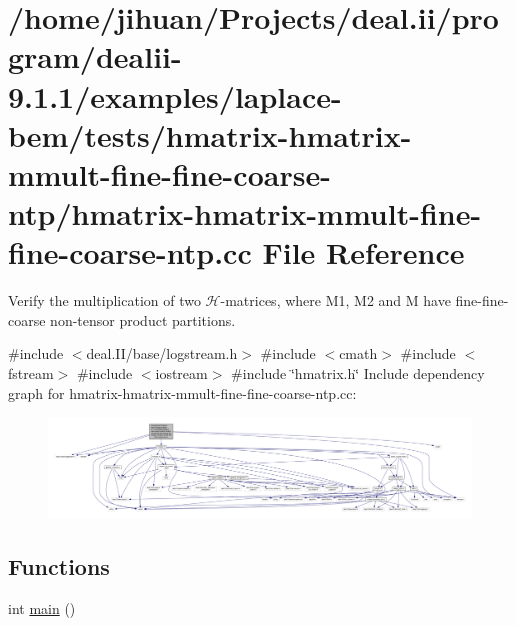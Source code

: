 \hypertarget{hmatrix-hmatrix-mmult-fine-fine-coarse-ntp_8cc}{}\section{/home/jihuan/\+Projects/deal.ii/program/dealii-\/9.1.1/examples/laplace-\/bem/tests/hmatrix-\/hmatrix-\/mmult-\/fine-\/fine-\/coarse-\/ntp/hmatrix-\/hmatrix-\/mmult-\/fine-\/fine-\/coarse-\/ntp.cc File Reference}
\label{hmatrix-hmatrix-mmult-fine-fine-coarse-ntp_8cc}


Verify the multiplication of two $\mathcal{H}$-\/matrices, where M1, M2 and M have fine-\/fine-\/coarse non-\/tensor product partitions.  


{\ttfamily \#include $<$deal.\+I\+I/base/logstream.\+h$>$}\newline
{\ttfamily \#include $<$cmath$>$}\newline
{\ttfamily \#include $<$fstream$>$}\newline
{\ttfamily \#include $<$iostream$>$}\newline
{\ttfamily \#include \char`\"{}hmatrix.\+h\char`\"{}}\newline
Include dependency graph for hmatrix-\/hmatrix-\/mmult-\/fine-\/fine-\/coarse-\/ntp.cc\+:\nopagebreak
\begin{figure}[H]
\begin{center}
\leavevmode
\includegraphics[width=350pt]{hmatrix-hmatrix-mmult-fine-fine-coarse-ntp_8cc__incl}
\end{center}
\end{figure}
\subsection*{Functions}
\begin{DoxyCompactItemize}
\item 
int \hyperlink{hmatrix-hmatrix-mmult-fine-fine-coarse-ntp_8cc_ae66f6b31b5ad750f1fe042a706a4e3d4}{main} ()
\end{DoxyCompactItemize}


